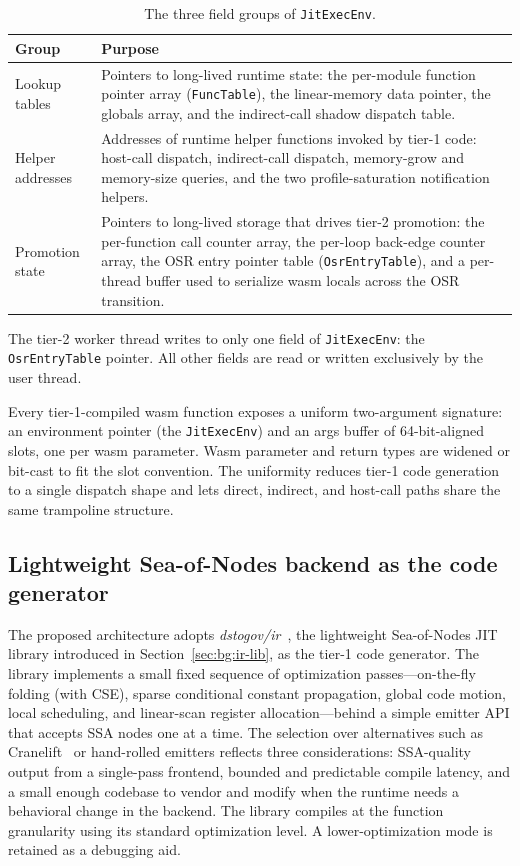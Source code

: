 \begin{table}[h]
\centering
\small
\begin{tabular}{l p{10cm}}
\toprule
Group & Purpose \\
\midrule
Lookup tables  & Pointers to long-lived runtime state: the per-module function pointer array (\texttt{FuncTable}), the linear-memory data pointer, the globals array, and the indirect-call shadow dispatch table. \\
\addlinespace
Helper addresses & Addresses of runtime helper functions invoked by tier-1 code: host-call dispatch, indirect-call dispatch, memory-grow and memory-size queries, and the two profile-saturation notification helpers. \\
\addlinespace
Promotion state & Pointers to long-lived storage that drives tier-2 promotion: the per-function call counter array, the per-loop back-edge counter array, the OSR entry pointer table (\texttt{OsrEntryTable}), and a per-thread buffer used to serialize wasm locals across the OSR transition. \\
\bottomrule
\end{tabular}
\caption{The three field groups of \texttt{JitExecEnv}.}
\label{tbl:jitexecenv}
\end{table}

The tier-2 worker thread writes to only one field of \texttt{JitExecEnv}: the \texttt{OsrEntryTable} pointer. All other fields are read or written exclusively by the user thread.

Every tier-1-compiled wasm function exposes a uniform two-argument signature: an environment pointer (the \texttt{JitExecEnv}) and an args buffer of 64-bit-aligned slots, one per wasm parameter. Wasm parameter and return types are widened or bit-cast to fit the slot convention. The uniformity reduces tier-1 code generation to a single dispatch shape and lets direct, indirect, and host-call paths share the same trampoline structure.

\subsection{Lightweight Sea-of-Nodes backend as the code generator}
\label{sec:design:tier1:backend}

The proposed architecture adopts \emph{dstogov/ir}~\cite{dstogov-ir}, the lightweight Sea-of-Nodes JIT library introduced in Section~\ref{sec:bg:ir-lib}, as the tier-1 code generator. The library implements a small fixed sequence of optimization passes---on-the-fly folding (with CSE), sparse conditional constant propagation, global code motion, local scheduling, and linear-scan register allocation---behind a simple emitter API that accepts SSA nodes one at a time. The selection over alternatives such as Cranelift~\cite{cranelift} or hand-rolled emitters reflects three considerations: SSA-quality output from a single-pass frontend, bounded and predictable compile latency, and a small enough codebase to vendor and modify when the runtime needs a behavioral change in the backend. The library compiles at the function granularity using its standard optimization level. A lower-optimization mode is retained as a debugging aid.

